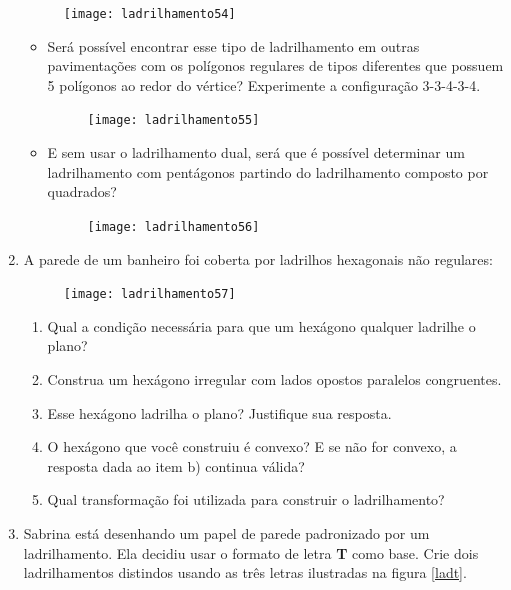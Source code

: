 \begin{enumerate}
\begin{figure}[H]
	\centering
	\texttt{[image: ladrilhamento54]}

\end{figure}

\begin{itemize}


\item Será possível encontrar esse tipo de ladrilhamento em outras pavimentações com os polígonos regulares de tipos diferentes que possuem 5 polígonos ao redor do vértice? 	Experimente a configuração 3-3-4-3-4.

	\begin{figure}[H]
	\centering
	\texttt{[image: ladrilhamento55]}

	\end{figure}

\item 	E sem usar o ladrilhamento dual, será que é possível determinar um ladrilhamento com pentágonos partindo do ladrilhamento composto por quadrados?

	\begin{figure}[H]
	\centering
	\texttt{[image: ladrilhamento56]}

	\end{figure}

\end{itemize}

\item  A parede de um banheiro foi coberta por ladrilhos hexagonais não regulares:

	\begin{figure}[H]
	\centering
	\texttt{[image: ladrilhamento57]}

	\end{figure}
	\begin{enumerate}
		\item Qual a condição necessária para que um hexágono qualquer ladrilhe o plano?
		\item Construa um hexágono irregular com lados opostos paralelos congruentes.
		\item Esse hexágono ladrilha o plano? Justifique sua resposta.
		\item O hexágono que você construiu é convexo? E se não for convexo, a resposta dada ao item b) continua válida?
		\item Qual transformação foi utilizada para construir o ladrilhamento?
	\end{enumerate}
	
	
\item 
Sabrina está desenhando um papel de parede padronizado por um ladrilhamento. Ela decidiu usar o formato de letra \textbf{T} como base. Crie dois ladrilhamentos distindos usando as três letras ilustradas na figura \ref{ladt}.


\end{enumerate}

